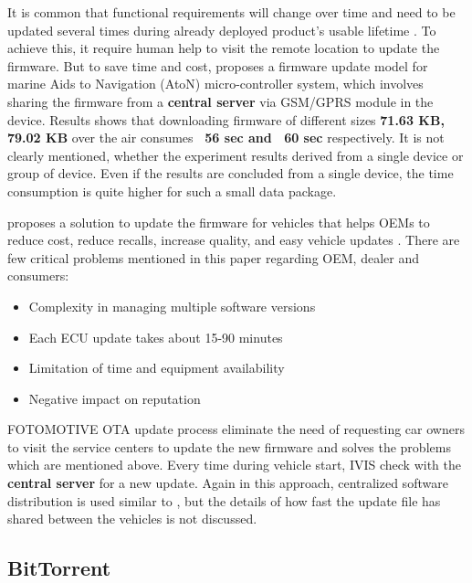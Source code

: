 \documentclass[12pt]{article}
\begin{document}
It is common that functional requirements will change over time and need to be updated several times during already deployed product's usable lifetime \cite{moorits}. To achieve this, it require human help to visit the remote location to update the firmware. But to save time and cost, {\protect\NoHyper\citeauthor{moorits}\protect\endNoHyper} \cite{moorits} proposes a firmware update model for marine Aids to Navigation (AtoN) micro-controller system, which involves sharing the firmware from a \textbf{central server}\cite{moorits} via GSM/GPRS module in the device. Results shows that downloading firmware of different sizes \textbf{71.63 KB, 79.02 KB} over the air consumes \textbf{~56 sec and ~60 sec} respectively. It is not clearly mentioned, whether the experiment results derived from a single device or group of device. Even if the results are concluded from a single device, the time consumption is quite higher for such a small data package.

{\protect\NoHyper\citeauthor{ganesan}\protect\endNoHyper} \cite{ganesan} proposes a solution to update the firmware for vehicles that helps OEMs to reduce cost, reduce recalls, increase quality, and easy vehicle updates \cite{ganesan}. There are few critical problems mentioned in this paper regarding OEM, dealer and consumers:
\begin{itemize}
	\item Complexity in managing multiple software versions
	\item Each ECU update takes about 15-90 minutes \cite{ganesan}
	\item Limitation of time and equipment availability 
	\item Negative impact on reputation
\end{itemize}

FOTOMOTIVE OTA update process eliminate the need of requesting car owners to visit the service centers to update the new firmware and solves the problems which are mentioned above. Every time during vehicle start, IVIS check with the \textbf{central server} for a new update. Again in this approach, centralized software distribution is used similar to \cite{moorits}, but the details of how fast the update file has shared between the vehicles is not discussed.

\subsection{BitTorrent}
\end{document}
